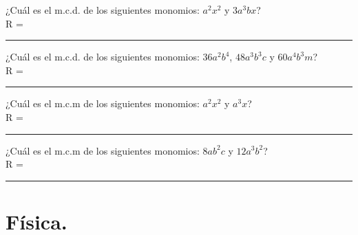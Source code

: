 \documentclass[14pt]{exam}
\begin{document}
\begin{questions}
\begin{oneparchoices}
    \end{oneparchoices}
    \question ¿Cuál es el m.c.d. de los siguientes monomios: $a^{2} x^{2}$ y $3 a^{3} b x$? \\[0.5em]
    R = \rule{3cm}{0.1mm}
    \question ¿Cuál es el m.c.d. de los siguientes monomios: $36 a^{2} b^{4}$, $48 a^{3} b^{3} c$ y $60 a^{4} b^{3} m$? \\[0.5em]
    R = \rule{3cm}{0.1mm}
    \question ¿Cuál es el m.c.m de los siguientes monomios: $a^{2} x^{2}$ y $a^{3} x$? \\[0.5em]
    R = \rule{3cm}{0.1mm}
    \question ¿Cuál es el m.c.m de los siguientes monomios: $8 a b^{2} c$ y $12 a^{3} b^{2}$? \\[0.5em]
    R = \rule{3cm}{0.1mm}
\end{questions}

\newpage

\section{Física.}
\end{document}
